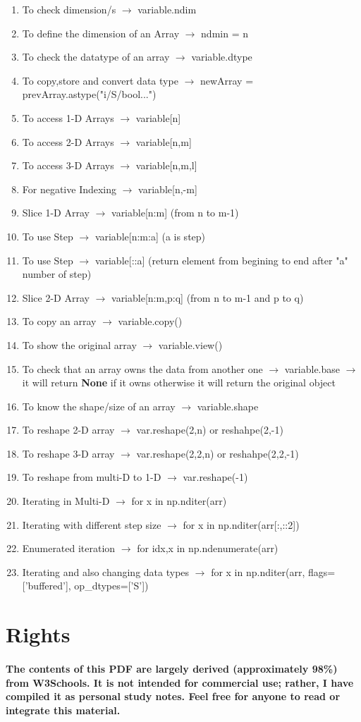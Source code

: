 \documentclass[openany]{book}
\begin{document}
\begin{enumerate}
    \item To check dimension/s $\rightarrow$ variable.ndim 
    \item To define the dimension of an Array $\rightarrow$ ndmin = n 
    \item To check the datatype of an array $\rightarrow$ variable.dtype
    \item To copy,store and convert data type $\rightarrow$ newArray = prevArray.astype("i/S/bool...")
    \item To access 1-D Arrays $\rightarrow$ variable[n]
    \item To access 2-D Arrays $\rightarrow$ variable[n,m]
    \item To access 3-D Arrays $\rightarrow$ variable[n,m,l]
    \item For negative Indexing $\rightarrow$ variable[n,-m]
    \item Slice 1-D Array $\rightarrow$ variable[n:m] (from n to m-1)
    \item To use Step $\rightarrow$ variable[n:m:a] (a is step)
    \item To use Step $\rightarrow$ variable[::a] (return element from begining to end after "a" number of step)
    \item Slice 2-D Array $\rightarrow$ variable[n:m,p:q] (from n to m-1 and p to q)
    \item To copy an array $\rightarrow$ variable.copy()
    \item To show the original array $\rightarrow$ variable.view()
    \item To check that an array owns the data from another one $\rightarrow$ variable.base $\rightarrow$ it will return \textbf{None} if it owns otherwise it will return the original object
    \item To know the shape/size of an array $\rightarrow$ variable.shape
    \item To reshape 2-D array $\rightarrow$ var.reshape(2,n) or reshahpe(2,-1)
    \item To reshape 3-D array $\rightarrow$ var.reshape(2,2,n) or reshahpe(2,2,-1)
    \item To reshape from multi-D to 1-D $\rightarrow$ var.reshape(-1)
    \item Iterating in Multi-D $\rightarrow$ for x in np.nditer(arr)
    \item Iterating with different step size $\rightarrow$ for x in np.nditer(arr[:,::2])
    \item Enumerated iteration $\rightarrow$ for idx,x in np.ndenumerate(arr)
    \item Iterating and also changing data types $\rightarrow$ for x in np.nditer(arr, flags=['buffered'], op\_dtypes=['S'])
\end{enumerate}

\newpage

\section{Rights}

\paragraph{The contents of this PDF are largely derived (approximately 98\%) from W3Schools. It is not intended for commercial use; rather, I have compiled it as personal study notes. Feel free for anyone to read or integrate this material.}

\cleardoublepage
\end{document}
